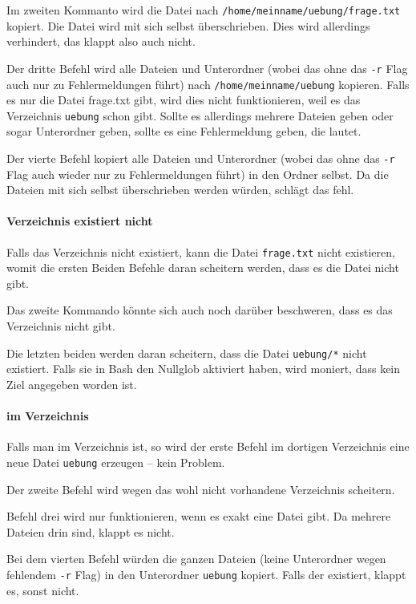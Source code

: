 Im zweiten Kommanto wird die Datei nach \texttt{/home/meinname/uebung/frage.txt} kopiert. Die Datei wird mit sich selbst überschrieben. Dies wird allerdings verhindert, das klappt also auch nicht.

Der dritte Befehl wird alle Dateien und Unterordner (wobei das ohne das \texttt{-r} Flag auch nur zu Fehlermeldungen führt) nach \texttt{/home/meinname/uebung} kopieren. Falls es nur die Datei frage.txt gibt, wird dies nicht funktionieren, weil es das Verzeichnis \texttt{uebung} schon gibt. Sollte es allerdings mehrere Dateien geben oder sogar Unterordner geben, sollte es eine Fehlermeldung geben, die  lautet.

Der vierte Befehl kopiert alle Dateien und Unterordner (wobei das ohne das \texttt{-r} Flag auch wieder nur zu Fehlermeldungen führt) in den Ordner selbst. Da die Dateien mit sich selbst überschrieben werden würden, schlägt das fehl.

\paragraph*{Verzeichnis existiert nicht} Falls das Verzeichnis nicht existiert, kann die Datei \texttt{frage.txt} nicht existieren, womit die ersten Beiden Befehle daran scheitern werden, dass es die Datei nicht gibt.

Das zweite Kommando könnte sich auch noch darüber beschweren, dass es das Verzeichnis nicht gibt.

Die letzten beiden werden daran scheitern, dass die Datei \texttt{uebung/*} nicht existiert. Falls sie in Bash den Nullglob aktiviert haben, wird moniert, dass kein Ziel angegeben worden ist.

\paragraph*{im Verzeichnis}

Falls man im Verzeichnis ist, so wird der erste Befehl im dortigen Verzeichnis eine neue Datei \texttt{uebung} erzeugen -- kein Problem.

Der zweite Befehl wird wegen das wohl nicht vorhandene Verzeichnis scheitern.

Befehl drei wird nur funktionieren, wenn es exakt eine Datei gibt. Da mehrere Dateien drin sind, klappt es nicht.

Bei dem vierten Befehl würden die ganzen Dateien (keine Unterordner wegen fehlendem \texttt{-r} Flag) in den Unterordner \texttt{uebung} kopiert. Falls der existiert, klappt es, sonst nicht.

